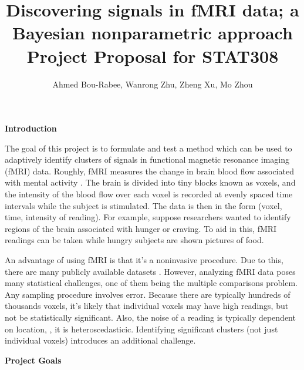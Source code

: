 \documentclass[12pt]{article}
\title{Discovering signals in fMRI data; 
a Bayesian nonparametric approach   \\ \large{Project Proposal for STAT308}}
\author{Ahmed Bou-Rabee, Wanrong Zhu, Zheng Xu, Mo Zhou}
\begin{document}
\maketitle

{\bf Introduction } 

The goal of this project is to formulate and test a method which can be used to adaptively identify 
clusters of signals in functional magnetic resonance imaging (fMRI) data. 
Roughly, fMRI measures the change in brain blood flow associated 
with mental activity \cite{huettel2004functional}. The brain is divided into tiny blocks known as voxels, and the intensity 
of the blood flow over each voxel is recorded at evenly spaced time intervals while the subject is stimulated. The data is then in the form 
(voxel, time, intensity of reading). For example, suppose researchers wanted to identify regions 
of the brain associated with hunger or craving. To aid in this, fMRI readings can be taken while hungry subjects are shown pictures of food. 

An advantage of using fMRI is that it's a noninvasive procedure.  Due to this, there are many publicly available datasets \cite{poldrack2013toward}.
However, analyzing fMRI data poses many statistical challenges, one of them being the multiple comparisons problem. 
 Any sampling procedure involves error.  Because there are typically hundreds of thousands voxels, it's likely that individual voxels 
 may have high readings, but not be statistically significant.  Also, the noise of a reading is typically dependent on location, \ie, it is heteroscedasticic.
 Identifying significant clusters (not just individual voxels) introduces an additional challenge. 

 
\vspace{0.5em}
{\bf Project Goals } 
\end{document}
